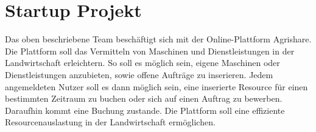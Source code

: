 \section{Startup Projekt}
Das oben beschriebene Team beschäftigt sich mit der Online-Plattform Agrishare. Die Plattform soll das Vermitteln von Maschinen und Dienstleistungen in der Landwirtschaft erleichtern. So soll es möglich sein, eigene Maschinen oder Dienstleistungen anzubieten, sowie offene Aufträge zu inserieren. Jedem angemeldeten Nutzer soll es dann möglich sein, eine inserierte Resource für einen bestimmten Zeitraum zu buchen oder sich auf einen Auftrag zu bewerben. Daraufhin kommt eine Buchung zustande. Die Plattform soll eine effiziente Resourcenauslastung in der Landwirtschaft ermöglichen.